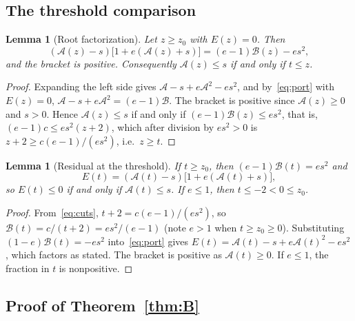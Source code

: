 \documentclass[11pt,a4paper]{article}
\theoremstyle{plain}
\newtheorem{lemma}[theorem]{Lemma}
\theoremstyle{definition}
\theoremstyle{remark}
\newcommand{\rA}{\mathcal{A}}
\newcommand{\rB}{\mathcal{B}}
\begin{document}
\subsection{The threshold comparison}

\begin{lemma}[Root factorization]\label{lem:factor}
Let $z\ge z_0$ with $E(z)=0$. Then
\begin{equation}\label{eq:rootfactor}
(\rA(z)-s)\bigl[1+e(\rA(z)+s)\bigr]=(e-1)\rB(z)-es^2 ,
\end{equation}
and the bracket is positive. Consequently $\rA(z)\le s$ if and only if $t\le z$.
\end{lemma}
\begin{proof}
Expanding the left side gives $\rA-s+e\rA^2-es^2$, and by~\eqref{eq:port} with $E(z)=0$, $\rA-s+e\rA^2=(e-1)\rB$. The bracket is positive since $\rA(z)\ge0$ and $s>0$. Hence $\rA(z)\le s$ if and only if $(e-1)\rB(z)\le es^2$, that is, $(e-1)c\le es^2(z+2)$, which after division by $es^2>0$ is $z+2\ge c(e-1)/(es^2)$, i.e.\ $z\ge t$.
\end{proof}

\begin{lemma}[Residual at the threshold]\label{lem:threshold}
If $t\ge z_0$, then $(e-1)\rB(t)=es^2$ and
\begin{equation}\label{eq:Et}
E(t)=(\rA(t)-s)\bigl[1+e(\rA(t)+s)\bigr],
\end{equation}
so $E(t)\le0$ if and only if $\rA(t)\le s$. If $e\le1$, then $t\le-2<0\le z_0$.
\end{lemma}
\begin{proof}
From~\eqref{eq:cuts}, $t+2=c(e-1)/(es^2)$, so $\rB(t)=c/(t+2)=es^2/(e-1)$ (note $e>1$ when $t\ge z_0\ge0$). Substituting $(1-e)\rB(t)=-es^2$ into~\eqref{eq:port} gives $E(t)=\rA(t)-s+e\rA(t)^2-es^2$, which factors as stated. The bracket is positive as $\rA(t)\ge0$. If $e\le1$, the fraction in $t$ is nonpositive.
\end{proof}

\subsection{Proof of Theorem~\ref{thm:B}}
\end{document}
